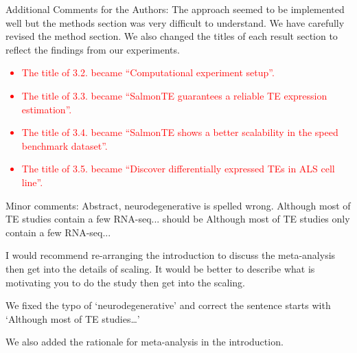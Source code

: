 \documentclass[10pt]{article}
\begin{document}
\begin{response}{Additional Comments for the Authors: The approach seemed to be implemented well but the methods section was very difficult to understand.}
We have carefully revised the method section. We also changed the titles of each result section to reflect the findings from our experiments. 

\textcolor{red}{
\begin{itemize}
	\item The title of 3.2. became ``Computational experiment setup''.
    \item The title of 3.3. became ``SalmonTE guarantees a reliable TE expression estimation''.
    \item The title of 3.4. became ``SalmonTE shows a better scalability in the speed benchmark dataset''.
	\item The title of 3.5. became ``Discover differentially expressed TEs in ALS cell line''.
\end{itemize}}
\end{response}

\begin{response}{
Minor comments: Abstract, neurodegenerative is spelled wrong. Although most of TE studies contain a few RNA-seq... should be Although most of TE studies only contain a few RNA-seq... 

I would recommend re-arranging the introduction to discuss the meta-analysis then get into the details of scaling. It would be better to describe what is motivating you to do the study then get into the scaling. }
We fixed the typo of `neurodegenerative' and correct the sentence starts with `Although most of TE studies\dots'

We also added the rationale for meta-analysis in the introduction. 
\end{response}
\end{document}
